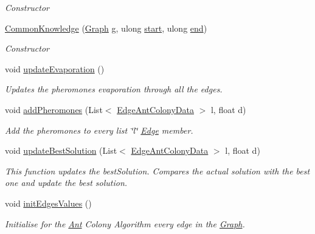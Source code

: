 \begin{DoxyCompactItemize}
\begin{DoxyCompactList}\small\item\em Constructor \end{DoxyCompactList}\item 
\hyperlink{classCommonKnowledge_a02217aadbccc0f894b458e413e3ea16e}{Common\+Knowledge} (\hyperlink{classGraph}{Graph} \hyperlink{classCommonKnowledge_afe6268d0091d9477d594b7207a9b0d8b}{g}, ulong \hyperlink{classCommonKnowledge_a968607c5b3027dc7db9178375a2071f2}{start}, ulong \hyperlink{classCommonKnowledge_a32a5f87ad72c95bbe3e3aabca913a5a6}{end})
\begin{DoxyCompactList}\small\item\em Constructor \end{DoxyCompactList}\item 
void \hyperlink{classCommonKnowledge_ac2325aee65d5cdc2ce638235000f71d9}{update\+Evaporation} ()
\begin{DoxyCompactList}\small\item\em Updates the pheromones evaporation through all the edges. \end{DoxyCompactList}\item 
void \hyperlink{classCommonKnowledge_ad18edb991c970daa0a21330896f37882}{add\+Pheromones} (List$<$ \hyperlink{classEdgeAntColonyData}{Edge\+Ant\+Colony\+Data} $>$ l, float d)
\begin{DoxyCompactList}\small\item\em Add the pheromones to every list \char`\"{}l\char`\"{} \hyperlink{classEdge}{Edge} member. \end{DoxyCompactList}\item 
void \hyperlink{classCommonKnowledge_a138990d0224d2ec75140944467f17489}{update\+Best\+Solution} (List$<$ \hyperlink{classEdgeAntColonyData}{Edge\+Ant\+Colony\+Data} $>$ l, float d)
\begin{DoxyCompactList}\small\item\em This function updates the best\+Solution. Compares the actual solution with the best one and update the best solution. \end{DoxyCompactList}\item 
void \hyperlink{classCommonKnowledge_a1ee7ccaca706571bb8a5db625d57413e}{init\+Edges\+Values} ()
\begin{DoxyCompactList}\small\item\em Initialise for the \hyperlink{classAnt}{Ant} Colony Algorithm every edge in the \hyperlink{classGraph}{Graph}. \end{DoxyCompactList}\item 

\end{DoxyCompactItemize}
